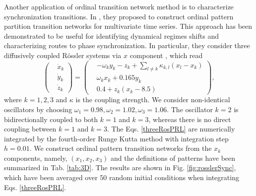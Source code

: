 	Another application of ordinal transition network method is to characterize synchronization transitions. In \cite{Zhang2017b}, they proposed to construct ordinal pattern partition transition networks for multivariate time series. This approach has been demonstrated to be useful for identifying dynamical regimes shifts and characterizing routes to phase synchronization. In particular, they consider three diffusively coupled R\"ossler systems via $x$ component \cite{Nawrath2010}, which read
\begin{equation} \label{threeRosPRL}
\left ( \begin{aligned}
& \dot{x}_k \\ 
& \dot{y}_k \\
& \dot{z}_k
\end{aligned} \right )
= \left ( \begin{aligned}
& -\omega_k y_k - z_k + \sum_{l\neq k} \kappa_{k,l}(x_l - x_k) \\ 
& \omega_k x_k + 0.165 y_k \\
& 0.4 + z_k(x_k - 8.5)
\end{aligned} \right ),
\end{equation}
where $k = 1, 2, 3$ and $\kappa$ is the coupling strength. We consider non-identical oscillators by choosing $\omega_1 = 0.98, \omega_2 = 1.02, \omega_3 = 1.06$. The oscillator $k = 2$ is bidirectionally coupled to both $k=1$ and $k=3$, whereas there is no direct coupling between $k=1$ and $k = 3$. The Eqs. \eqref{threeRosPRL} are numerically integrated by the fourth-order Runge Kutta method with integration step $h = 0.01$. We construct ordinal pattern transition networks from the $x_k$ components, namely, $(x_1, x_2, x_3)$ and the definitions of patterns have been summarized in Tab. \ref{tab:3D}. The results are shown in Fig. \ref{fig:rosslerSync}, which have been averaged over 50 random initial conditions when integrating Eqs. \eqref{threeRosPRL}. 

